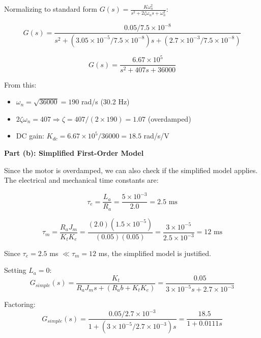 Normalizing to standard form $G(s) = \frac{K \omega_n^2}{s^2 + 2\zeta\omega_n s + \omega_n^2}$:

\begin{equation}
    G(s) = \frac{0.05 / 7.5 \times 10^{-8}}{s^2 + (3.05 \times 10^{-5} / 7.5 \times 10^{-8}) s + (2.7 \times 10^{-3} / 7.5 \times 10^{-8})}
\end{equation}

\begin{equation}
    G(s) = \frac{6.67 \times 10^{5}}{s^2 + 407 s + 36000}
\end{equation}

From this:
\begin{itemize}
    \item $\omega_n = \sqrt{36000} = 190$ rad/s (30.2 Hz)
    \item $2\zeta\omega_n = 407 \Rightarrow \zeta = 407/(2 \times 190) = 1.07$ (overdamped)
    \item DC gain: $K_{dc} = 6.67 \times 10^5 / 36000 = 18.5$ rad/s/V
\end{itemize}

\textbf{Part (b): Simplified First-Order Model}

Since the motor is overdamped, we can also check if the simplified model applies. The electrical and mechanical time constants are:

\begin{equation}
    \tau_e = \frac{L_a}{R_a} = \frac{5 \times 10^{-3}}{2.0} = 2.5 \text{ ms}
\end{equation}

\begin{equation}
    \tau_m = \frac{R_a J_m}{K_t K_e} = \frac{(2.0)(1.5 \times 10^{-5})}{(0.05)(0.05)} = \frac{3 \times 10^{-5}}{2.5 \times 10^{-3}} = 12 \text{ ms}
\end{equation}

Since $\tau_e = 2.5$ ms $\ll \tau_m = 12$ ms, the simplified model is justified.

Setting $L_a = 0$:
\begin{equation}
    G_{simple}(s) = \frac{K_t}{R_a J_m s + (R_a b + K_t K_e)} = \frac{0.05}{3 \times 10^{-5} s + 2.7 \times 10^{-3}}
\end{equation}

Factoring:
\begin{equation}
    G_{simple}(s) = \frac{0.05 / 2.7 \times 10^{-3}}{1 + (3 \times 10^{-5} / 2.7 \times 10^{-3}) s} = \frac{18.5}{1 + 0.0111 s}
\end{equation}

